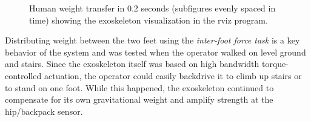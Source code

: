 \documentclass[utf8]{frontiersSCNS}
\begin{document}
\begin{figure}[t]
 	
 	\caption{Human weight transfer in 0.2 seconds (subfigures evenly spaced in time) showing the exoskeleton visualization in the rviz program.}\label{fig:transitions}
 \end{figure}
 
 
Distributing weight between the two feet using the \emph{inter-foot force task} is a key behavior of the system and was tested when the operator walked on level ground and stairs.
Since the exoskeleton itself was based on high bandwidth torque-controlled actuation, the operator could easily backdrive it to climb up stairs or to stand on one foot.
While this happened, the exoskeleton continued to compensate for its own gravitational weight and amplify strength at the hip/backpack sensor.


 
\end{document}
